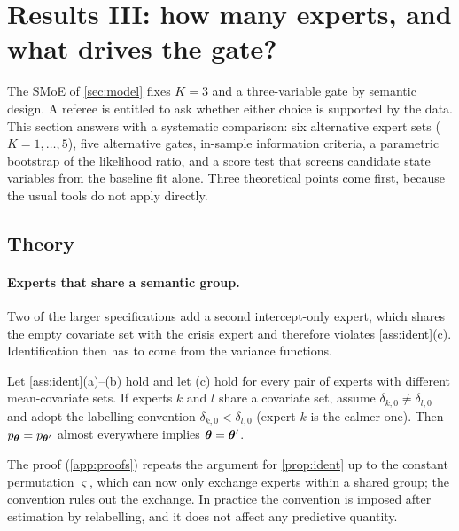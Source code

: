 \section{Results III: how many experts, and what drives the gate?}\label{sec:kgate}

The SMoE of \cref{sec:model} fixes $K=3$ and a three-variable gate by semantic design. A
referee is entitled to ask whether either choice is supported by the data. This section answers
with a systematic comparison: six alternative expert sets ($K=1,\dots,5$), five alternative gates,
in-sample information criteria, a parametric bootstrap of the likelihood ratio, and a score test that
screens candidate state variables from the baseline fit alone. Three theoretical points come first,
because the usual tools do not apply directly.

\subsection{Theory}

\paragraph{Experts that share a semantic group.}
Two of the larger specifications add a second intercept-only expert, which shares the empty
covariate set with the crisis expert and therefore violates \cref{ass:ident}(c). Identification
then has to come from the variance functions.

\begin{proposition}\label{prop:ident-shared}
Let \cref{ass:ident}(a)--(b) hold and let (c) hold for every pair of experts with different
mean-covariate sets. If experts $k$ and $l$ share a covariate set, assume $\delta_{k,0}\neq\delta_{l,0}$
and adopt the labelling convention $\delta_{k,0}<\delta_{l,0}$ (expert $k$ is the calmer one). Then
$p_{\bm{\theta}}=p_{\bm{\theta}'}$ almost everywhere implies $\bm{\theta}=\bm{\theta}'$.
\end{proposition}

\noindent The proof (\cref{app:proofs}) repeats the argument for \cref{prop:ident} up to the
constant permutation $\varsigma$, which can now only exchange experts within a shared group; the
convention rules out the exchange. In practice the convention is imposed after estimation by
relabelling, and it does not affect any predictive quantity.

